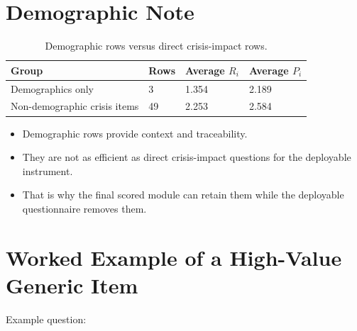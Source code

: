 \documentclass[12pt]{article}
\begin{document}
\section{Demographic Note}

\begin{table}[H]
\centering
\footnotesize
\begin{tabularx}{0.68\textwidth}{@{}L{0.34\textwidth} R{0.08\textwidth} R{0.10\textwidth} R{0.10\textwidth}@{}}
\toprule
Group & Rows & Average $R_i$ & Average $P_i$ \\
\midrule
Demographics only & 3 & 1.354 & 2.189 \\
Non-demographic crisis items & 49 & 2.253 & 2.584 \\
\bottomrule
\end{tabularx}
\caption{Demographic rows versus direct crisis-impact rows.}
\end{table}

\begin{itemize}
\item Demographic rows provide context and traceability.
\item They are not as efficient as direct crisis-impact questions for the deployable instrument.
\item That is why the final scored module can retain them while the deployable questionnaire removes them.
\end{itemize}

\section{Worked Example of a High-Value Generic Item}

Example question: 
\end{document}

